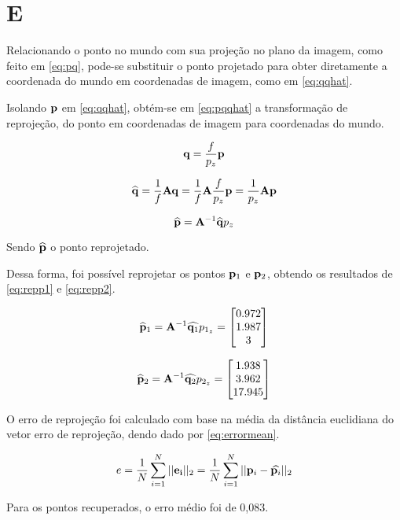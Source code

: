 \section{E}

Relacionando o ponto no mundo com sua projeção no plano da imagem, como feito em \eqref{eq:pq}, pode-se substituir o ponto projetado para obter diretamente a coordenada do mundo em coordenadas de imagem, como em \eqref{eq:qqhat}.

Isolando $\mathbf{p}$ em \eqref{eq:qqhat}, obtém-se em \eqref{eq:pqqhat} a transformação de reprojeção, do ponto em coordenadas de imagem para coordenadas do mundo.

\begin{equation}\label{eq:pq}
	\mathbf{q} = \frac{f}{p_z}\mathbf{p} 
\end{equation}

\begin{equation}\label{eq:qqhat}
	\widehat{\mathbf{q}} = \frac{1}{f}\mathbf{A} \mathbf{q}  = \frac{1}{f}\mathbf{A}\frac{f}{p_z}\mathbf{p}  = \frac{1}{p_z}\mathbf{A}\mathbf{p} 
\end{equation}

\begin{equation}\label{eq:pqqhat}
	\widehat{\mathbf{p}} = \mathbf{A}^{-1}\widehat{\mathbf{q}}p_z
\end{equation}

Sendo $\widehat{\mathbf{p}}$ o ponto reprojetado.

Dessa forma, foi possível reprojetar os pontos $\mathbf{p}_1$ e $\mathbf{p}_2$, obtendo os resultados de \eqref{eq:repp1} e \eqref{eq:repp2}.

\begin{equation}\label{eq:repp1}
	\widehat{\mathbf{p}}_1 = \mathbf{A}^{-1}\widehat{\mathbf{q}_1}p_{1_z} = \begin{bmatrix}
		0.972\\
		  1.987\\
		   3
	\end{bmatrix}
\end{equation}

\begin{equation}\label{eq:repp2}
	\widehat{\mathbf{p}}_2 = \mathbf{A}^{-1}\widehat{\mathbf{q}_2}p_{2_z} = \begin{bmatrix}
	1.938 \\
	 3.962 \\
	 17.945
\end{bmatrix}
\end{equation}

O erro de reprojeção foi calculado com base na média da distância euclidiana do vetor erro de reprojeção, dendo dado por \eqref{eq:errormean}.

\begin{equation}\label{eq:errormean}
	e = \frac{1}{N}\sum_{i=1}^{N}||\mathbf{e_i}||_2 = \frac{1}{N}\sum_{i=1}^{N}||\mathbf{p}_i - \widehat{\mathbf{p}_i}||_2
\end{equation}

Para os pontos recuperados, o erro médio foi de 0,083.
